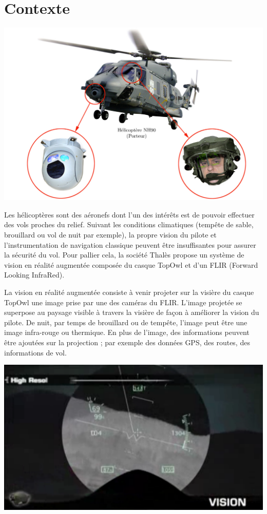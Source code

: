 

\section*{Contexte}

\begin{center}
\includegraphics[width=0.7\linewidth]{img/fig01}
\end{center}

Les hélicoptères sont des aéronefs dont l'un des intérêts est de pouvoir effectuer des vols proches du relief. Suivant les conditions climatiques (tempête de sable, brouillard ou vol de nuit par exemple), la propre vision du pilote et l'instrumentation de navigation classique peuvent être insuffisantes pour assurer la sécurité du vol. Pour pallier cela, la société Thalès propose un système de vision en réalité augmentée composée du casque TopOwl et d'un FLIR (Forward Looking InfraRed).

La vision en réalité augmentée consiste à venir projeter sur la visière du casque TopOwl une image prise par une des caméras du FLIR. L'image projetée se superpose au paysage visible à travers la visière de façon à améliorer la vision du pilote. De nuit, par temps de brouillard ou de tempête, l'image peut être une image infra-rouge ou thermique. En plus de l'image, des informations peuvent être ajoutées sur la projection ; par exemple des données GPS, des routes, des informations de vol.

\begin{center}
\includegraphics[width=0.5\linewidth]{img/fig02}
\end{center}

